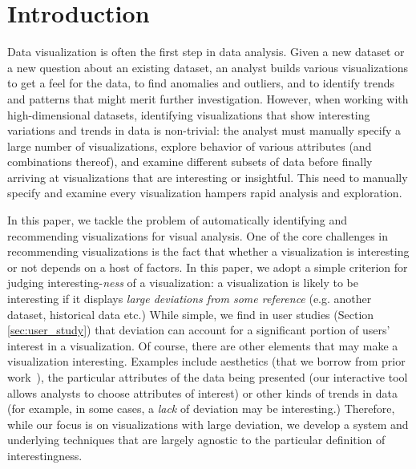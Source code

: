 
\section{Introduction}
\label{sec:introduction}
Data visualization is often the first step in data analysis.
Given a new dataset or a new question about an existing dataset, an analyst builds
various visualizations to get a feel for the data, to find anomalies and outliers, 
and to identify trends and patterns that might merit further investigation.
However, when working with high-dimensional datasets, identifying visualizations that
show interesting variations and trends in data is non-trivial:
the analyst must manually specify a large number of visualizations, explore behavior of various
attributes (and combinations thereof), and examine different subsets of data before finally 
arriving at visualizations that are interesting or insightful.
This need to manually specify and examine every visualization hampers rapid analysis 
and exploration.

In this paper, we tackle the problem of automatically 
identifying and recommending 
visualizations for visual analysis.  
One of the core challenges in recommending visualizations is the fact that 
whether a visualization is interesting or not
depends on a host of factors.
In this paper, we adopt a simple criterion for judging interesting-{\em ness} of a visualization: 
a visualization is likely to be interesting if it displays 
{\em large deviations from some
reference} (e.g. another dataset, historical data etc.)
While simple, we find in user studies (Section \ref{sec:user_study}) 
that deviation can account for a significant portion of users' interest in a visualization.
Of course, there are other elements that may make a visualization interesting.
Examples include aesthetics (that 
we borrow from prior work~\cite{polaris,Mackinlay:1986:ADG:22949.22950}), 
the particular attributes of the data being presented 
(our interactive tool allows analysts to choose attributes of interest) 
or other kinds of trends in
data (for example, in some cases, a {\it lack} of deviation may be interesting.)  
Therefore, while our focus is on visualizations with large deviation, 
we develop a system and underlying techniques that are largely agnostic to the
particular definition of interestingness.

